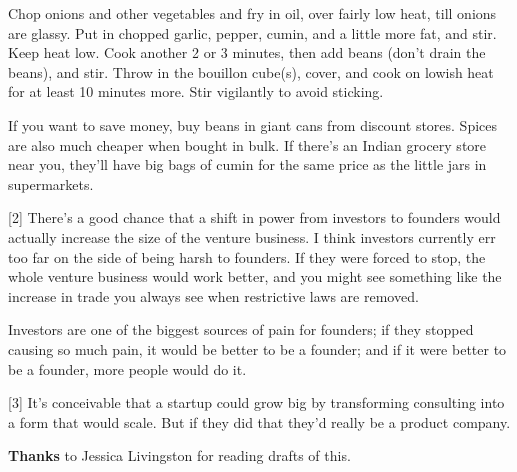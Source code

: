 Chop onions and other
                  vegetables and fry in oil, over fairly low heat, till onions
                  are glassy. Put in chopped garlic, pepper, cumin, and a little
                  more fat, and stir. Keep heat low. Cook another 2 or 3
                  minutes, then add beans (don't drain the beans), and stir.
                  Throw in the bouillon cube(s), cover, and cook on lowish heat
                  for at least 10 minutes more. Stir vigilantly to avoid
                  sticking.

If you want to save money, buy beans in
                  giant cans from discount stores. Spices are also much cheaper
                  when bought in bulk. If there's an Indian grocery store near
                  you, they'll have big bags of cumin for the same price as the
                  little jars in supermarkets.

[2] There's a good chance that a shift in power from investors
                  to founders would actually increase the size of the venture
                  business. I think investors currently err too far on the side
                  of being harsh to founders. If they were forced to stop, the
                  whole venture business would work better, and you might see
                  something like the increase in trade you always see when
                  restrictive laws are removed.

Investors are one of
                  the biggest sources of pain for founders; if they stopped
                  causing so much pain, it would be better to be a founder; and
                  if it were better to be a founder, more people would do it.

[3] It's conceivable that a startup could grow big by
                  transforming consulting into a form that would scale. But if
                  they did that they'd really be a product company.

\textbf{Thanks}
                  to Jessica Livingston for reading drafts of this.


              
            
          
